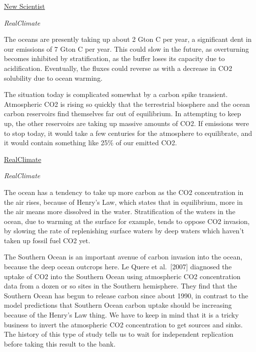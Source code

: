 \documentclass[
]{book}
\begin{document}
\href{https://www.newscientist.com/article/dn20413-warmer-oceans-release-co2-faster-than-thought/}{New Scientist}

\emph{RealClimate}

The oceans are presently taking up about 2 Gton C per year, a significant dent in our emissions of 7 Gton C per year. This could slow in the future, as overturning becomes inhibited by stratification, as the buffer loses its capacity due to acidification. Eventually, the fluxes could reverse as with a decrease in CO2 solubility due to ocean warming.

The situation today is complicated somewhat by a carbon spike transient. Atmospheric CO2 is rising so quickly that the terrestrial biosphere and the ocean carbon reservoirs find themselves far out of equilibrium. In attempting to keep up, the other reservoirs are taking up massive amounts of CO2. If emissions were to stop today, it would take a few centuries for the atmosphere to equilibrate, and it would contain something like 25\% of our emitted CO2.

\href{https://www.realclimate.org/index.php/archives/2006/05/positive-feedbacks-from-the-carbon-cycle/}{RealClimate}

\emph{RealClimate}

The ocean has a tendency to take up more carbon as the CO2 concentration in the air rises, because of Henry's Law, which states that in equilibrium, more in the air means more dissolved in the water. Stratification of the waters in the ocean, due to warming at the surface for example, tends to oppose CO2 invasion, by slowing the rate of replenishing surface waters by deep waters which haven't taken up fossil fuel CO2 yet.

The Southern Ocean is an important avenue of carbon invasion into the ocean, because the deep ocean outcrops here. Le Quere et al.~{[}2007{]} diagnosed the uptake of CO2 into the Southern Ocean using atmospheric CO2 concentration data from a dozen or so sites in the Southern hemisphere. They find that the Southern Ocean has begun to release carbon since about 1990, in contrast to the model predictions that Southern Ocean carbon uptake should be increasing because of the Henry's Law thing. We have to keep in mind that it is a tricky business to invert the atmospheric CO2 concentration to get sources and sinks. The history of this type of study tells us to wait for independent replication before taking this result to the bank.
\end{document}
